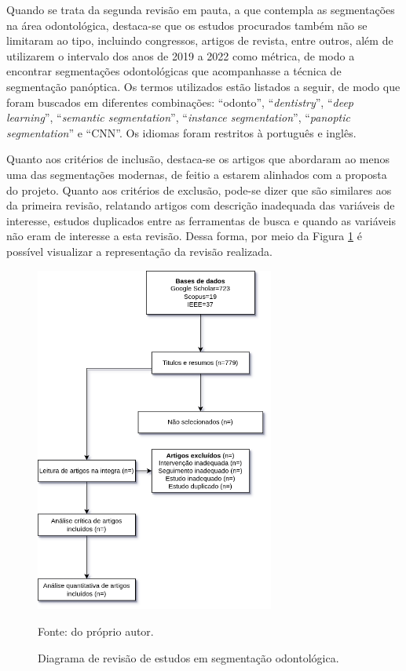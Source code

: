 Quando se trata da segunda revisão em pauta, a que contempla as segmentações na área odontológica, destaca-se que os estudos procurados também não se limitaram ao tipo, incluindo congressos, artigos de revista, entre outros, além de utilizarem o intervalo dos anos de 2019 a 2022 como métrica, de modo a encontrar segmentações odontológicas que acompanhasse a técnica de segmentação panóptica. Os termos utilizados estão listados a seguir, de modo que foram buscados em diferentes combinações: ``odonto'', ``\textit{dentistry}'', ``\textit{deep learning}'', ``\textit{semantic segmentation}'', ``\textit{instance segmentation}'', ``\textit{panoptic segmentation}'' e ``CNN''. Os idiomas foram restritos à português e inglês.

Quanto aos critérios de inclusão, destaca-se os artigos que abordaram ao menos uma das segmentações modernas, de feitio a estarem alinhados com a proposta do projeto. Quanto aos critérios de exclusão, pode-se dizer que são similares aos da primeira revisão, relatando artigos com descrição inadequada das variáveis de interesse, estudos duplicados entre as ferramentas de busca e quando as variáveis não eram de interesse a esta revisão. Dessa forma, por meio da Figura \ref{proposal:revision:fig:2} é possível visualizar a representação da revisão realizada.

\begin{figure}[H]
    \centering
    \caption{Diagrama de revisão de estudos em segmentação odontológica.}
    \includegraphics[height=4.5in]{recursos/imagens/proposal/revisao2.png}
    \label{proposal:revision:fig:2}

    \vspace*{1 cm}
    Fonte: do próprio autor.
\end{figure}



